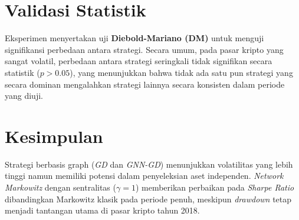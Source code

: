 \documentclass[12pt,a4paper]{article}
\begin{document}
\section{Validasi Statistik}
Eksperimen menyertakan uji \textbf{Diebold-Mariano (DM)} untuk menguji signifikansi perbedaan antara strategi. Secara umum, pada pasar kripto yang sangat volatil, perbedaan antara strategi seringkali tidak signifikan secara statistik ($p > 0.05$), yang menunjukkan bahwa tidak ada satu pun strategi yang secara dominan mengalahkan strategi lainnya secara konsisten dalam periode yang diuji.

\section{Kesimpulan}
Strategi berbasis graph (\textit{GD} dan \textit{GNN-GD}) menunjukkan volatilitas yang lebih tinggi namun memiliki potensi dalam penyeleksian aset independen. \textit{Network Markowitz} dengan sentralitas ($\gamma=1$) memberikan perbaikan pada \textit{Sharpe Ratio} dibandingkan Markowitz klasik pada periode penuh, meskipun \textit{drawdown} tetap menjadi tantangan utama di pasar kripto tahun 2018.
\end{document}
